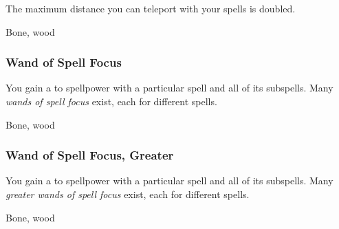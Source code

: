 The maximum distance you can teleport with your  spells is doubled.



 


 Bone, wood


\lowercase{\hypertarget{item:Wand of Spell Focus}{}}\label{item:Wand of Spell Focus}
\hypertarget{item:Wand of Spell Focus}{\subsubsection{Wand of Spell Focus\hfill{}}}

You gain a   to spellpower with a particular spell and all of its subspells.
Many \textit{wands of spell focus} exist, each for different spells.



 


 Bone, wood


\lowercase{\hypertarget{item:Wand of Spell Focus, Greater}{}}\label{item:Wand of Spell Focus, Greater}
\hypertarget{item:Wand of Spell Focus, Greater}{\subsubsection{Wand of Spell Focus, Greater\hfill{}}}

You gain a   to spellpower with a particular spell and all of its subspells.
Many \textit{greater wands of spell focus} exist, each for different spells.



 


 Bone, wood
